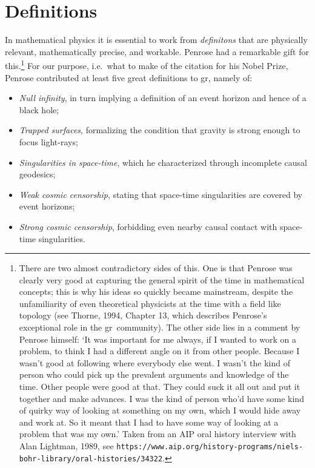 \documentclass[11pt,a4paper]{article}
\newcommand{\GR}{{\sc gr}}
\begin{document}
 \section{Definitions}\label{Defs}
In mathematical physics it is essential to work from  \emph{definitons} that are physically relevant, mathematically precise, and workable. Penrose had a remarkable gift for this.\footnote{There are two almost contradictory sides of this. One is that Penrose was clearly very good at capturing the general spirit of the time in mathematical concepts; this is why his ideas so quickly became mainstream, despite the unfamiliarity of even theoretical physicists at the time with a field like topology (see
Thorne, 1994, Chapter 13, which describes  Penrose's exceptional role in the \GR\ community).  The other side lies in a
comment by Penrose himself: `It was important for me always, if I wanted to work on a problem, to think I had a different angle on it from other people. Because I wasn't good at following where everybody else went. I wasn't the kind of person who could pick up the prevalent arguments and knowledge of the time. Other people were good at that. They could suck it all out and put it together and make advances. I was the kind of person who'd have some kind of quirky way of looking at something on my own, which I would hide away and work at. So it meant that I had to have some way of looking at a problem that was my own.'  Taken from an AIP oral history interview with Alan Lightman, 1989, see \texttt{https://www.aip.org/history-programs/niels-bohr-library/oral-histories/34322}. }
For our purpose, i.e.\ what to make of the citation for his Nobel Prize,
 Penrose contributed at least five great definitions to \GR, namely of:
\begin{itemize}
\item \emph{Null infinity}, in turn implying a definition of an event horizon and hence of a black hole;
\item \emph{Trapped surfaces}, formalizing the condition that gravity is strong enough to focus light-rays;
\item \emph{Singularities in space-time}, which he characterized through incomplete causal geodesics;
\item \emph{Weak cosmic censorship}, stating that space-time singularities are covered by event horizons;
\item \emph{Strong  cosmic censorship}, forbidding even nearby causal contact with  space-time singularities.
\end{itemize}
\end{document}
